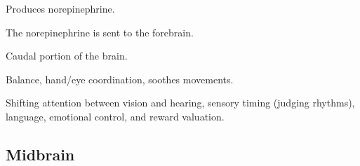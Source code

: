 \begin{coloredlist}
\begin{coloredlist}
\begin{coloredlist}
            \begin{coloredlist}
                \item Produces norepinephrine.
                \item The norepinephrine is sent to the forebrain.
            \end{coloredlist}
        \end{coloredlist}
        \item {}
        \begin{coloredlist}
            \item Caudal portion of the brain.
            \item Balance, hand/eye coordination, soothes movements.
            \item Shifting attention between vision and hearing, sensory timing (judging rhythms), language, emotional control, and reward valuation.
        \end{coloredlist}
    \end{coloredlist}
\end{coloredlist}

\subsection{Midbrain}

